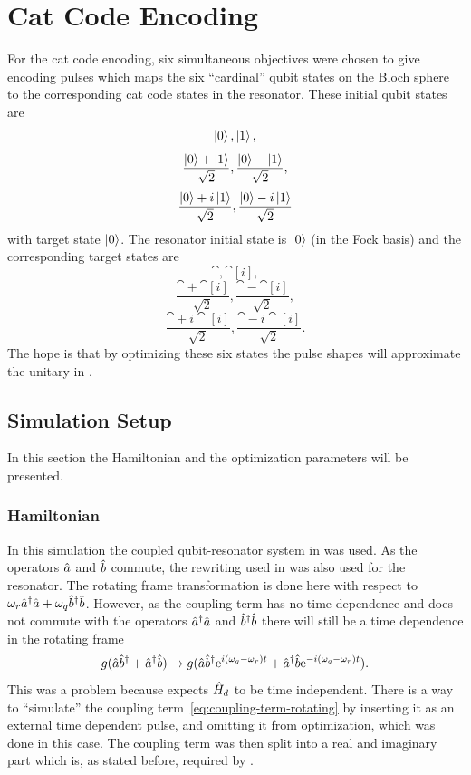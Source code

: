 \documentclass[main.tex]{subfiles}
\begin{document}
\chapter{Cat Code Encoding}
For the cat code encoding, six simultaneous objectives were chosen to give encoding pulses which maps the six ``cardinal'' qubit states on the Bloch sphere to the corresponding cat code states in the resonator.
These initial qubit states are
\[ \ket{0}, \ket{1},\]
\[ \frac{\ket{0}+\ket{1}}{\sqrt{2}}, \frac{\ket{0}-\ket{1}}{\sqrt{2}},\]
\[ \frac{\ket{0}+i\ket{1}}{\sqrt{2}}, \frac{\ket{0}-i\ket{1}}{\sqrt{2}} \]
with target state \(\ket{0}\).
The resonator initial state is \(\ket{0}\) (in the Fock basis) and the corresponding target states are
\[ \cat{}, \cat[i]{},\]
\[ \frac{\cat{}+\cat[i]{}}{\sqrt{2}}, \frac{\cat{}-\cat[i]{}}{\sqrt{2}},\]
\[ \frac{\cat{}+i\cat[i]{}}{\sqrt{2}}, \frac{\cat{}-i\cat[i]{}}{\sqrt{2}}. \]
The hope is that by optimizing these six states the pulse shapes will approximate the unitary in .

\section{Simulation Setup}
In this section the Hamiltonian and the optimization parameters will be presented.

\subsection{Hamiltonian}
In this simulation the coupled qubit-resonator system in  was used.
As the operators \(\hat{a}\) and \(\hat{b}\) commute, the rewriting used in  was also used for the resonator.
The rotating frame transformation is done here with respect to \(\omega_{r} \hat{a}^\dagger\hat{a} + \omega_{q} \hat{b}^\dagger\hat{b} \).
However, as the coupling term has no time dependence and does not commute with the operators \(\hat{a}^\dagger\hat{a} \) and \(\hat{b}^\dagger\hat{b} \) there will still be a time dependence in the rotating frame
\begin{equation}
    g(\hat{a}\hat{b}^\dagger + \hat{a}^\dagger\hat{b}) \rightarrow g(\hat{a}\hat{b}^\dagger\mathrm{e}^{i(\omega_q-\omega_r)t} + \hat{a}^\dagger\hat{b}\mathrm{e}^{-i(\omega_q-\omega_r)t}).
    \label{eq:coupling-term-rotating}
\end{equation}
This was a problem because \krotov{} expects \(\hat{H}_d\) to be time independent.
There is a way to ``simulate'' the coupling term~\eqref{eq:coupling-term-rotating} by inserting it as an external time dependent pulse, and omitting it from optimization, which was done in this case.
The coupling term was then split into a real and imaginary part which is, as stated before, required by \krotov{}.
\end{document}
